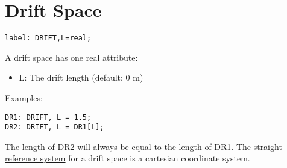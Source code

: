 
\section{Drift Space}

\begin{verbatim}
label: DRIFT,L=real;
\end{verbatim} 

A drift space has one real attribute: 
\begin{itemize}
   \item L: The drift length (default: 0 m) 
\end{itemize} 

Examples: 
\begin{verbatim}
DR1: DRIFT, L = 1.5;
DR2: DRIFT, L = DR1[L];
\end{verbatim} 

The length of DR2 will always be equal to the length of DR1. The
\href{../Introduction/local_system.html#straight}{straight reference
  system} for a drift space is a cartesian coordinate system.  

